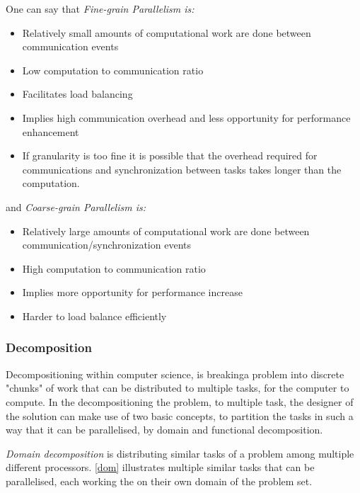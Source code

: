 One can say that \emph{Fine-grain Parallelism is:}
\begin{itemize}
  \item Relatively small amounts of computational work are done between communication events

  \item Low computation to communication ratio

  \item Facilitates load balancing

  \item Implies high communication overhead and less opportunity for performance enhancement

  \item If granularity is too fine it is possible that the overhead required for communications and synchronization between tasks takes longer than the computation.
\end{itemize}
and \emph{Coarse-grain Parallelism is:}
\begin{itemize}
  \item Relatively large amounts of computational work are done between communication/synchronization events

  \item High computation to communication ratio

  \item Implies more opportunity for performance increase

  \item Harder to load balance efficiently
\end{itemize}

\subsubsection{Decomposition}
  Decompositioning within computer science, is breakinga problem into discrete "chunks" of work that can be distributed to multiple tasks, for the computer to compute.
  In the decompositioning the problem, to multiple task, the designer of the solution can make use of two basic concepts, to partition the tasks in such a way that it can be parallelised, by domain and functional decomposition.

  \emph{Domain decomposition} is distributing similar tasks of a problem among multiple different processors. \cref{dom} illustrates multiple similar tasks that can be parallelised, each working the on their own domain of the problem set.

